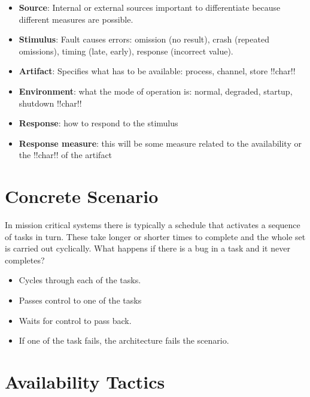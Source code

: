 \documentclass[a4paper]{report}
\begin{document}
\begin{itemize}
\item{\textbf{Source}: Internal or external sources important to differentiate because different measures are possible.}
\item{\textbf{Stimulus}: Fault causes errors: omission (no result), crash (repeated omissions), timing (late, early), response (incorrect value).}
\item{\textbf{Artifact}: Specifies what has to be available: process, channel, store !!char!!}
\item{\textbf{Environment}: what the mode of operation is: normal, degraded, startup, shutdown !!char!!}
\item{\textbf{Response}:  how to respond to the stimulus }
\item{\textbf{Response measure}: this will be some measure related to the availability or the !!char!! of the artifact}
\end{itemize}

\section{Concrete Scenario}

In mission critical systems there is typically a schedule that activates a sequence of tasks in turn.  These take longer or shorter times to complete and the whole set is carried out cyclically. What happens if there is a bug in a task and it never completes?

\begin{itemize}
\item{Cycles through each of the tasks.}
\item{Passes control to one of the tasks}
\item{Waits for control to pass back.}
\item{If one of the task fails, the architecture fails the scenario.}
\end{itemize}

\pagebreak
\section{Availability Tactics}
\end{document}
